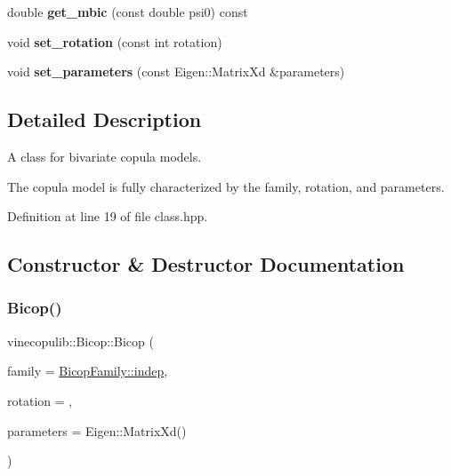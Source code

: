 \begin{DoxyCompactItemize}
double {\bfseries get\+\_\+mbic} (const double psi0) const
\item 
\mbox{\label{classvinecopulib_1_1_bicop_a53be89bcc576f0192fe2690af3f6d93c}} 
void {\bfseries set\+\_\+rotation} (const int rotation)
\item 
\mbox{\label{classvinecopulib_1_1_bicop_ac8d1d4266b0fd7e2f971d0149f881ef9}} 
void {\bfseries set\+\_\+parameters} (const Eigen\+::\+Matrix\+Xd \&parameters)
\end{DoxyCompactItemize}


\subsection{Detailed Description}
A class for bivariate copula models. 

The copula model is fully characterized by the family, rotation, and parameters. 

Definition at line 19 of file class.\+hpp.



\subsection{Constructor \& Destructor Documentation}
\mbox{\label{classvinecopulib_1_1_bicop_ad9b900b5d0ad9ba3d4a95a114b322291}} 
\subsubsection{\texorpdfstring{Bicop()}{Bicop()}\hspace{0.1cm}{\footnotesize\ttfamily [1/4]}}
{\footnotesize\ttfamily vinecopulib\+::\+Bicop\+::\+Bicop (\begin{DoxyParamCaption}\item[{const \hyperlink{namespacevinecopulib_a42e95cc06d33896199caab0c11ad44f3}{Bicop\+Family}}]{family = {\ttfamily \hyperlink{namespacevinecopulib_a42e95cc06d33896199caab0c11ad44f3af49b022096e968010a7b9bd941805a65}{Bicop\+Family\+::indep}},  }\item[{const int}]{rotation = {},  }\item[{const Eigen\+::\+Matrix\+Xd \&}]{parameters = {\ttfamily Eigen\+:\+:MatrixXd()} }\end{DoxyParamCaption})\hspace{0.3cm}{\ttfamily [inline]}}



